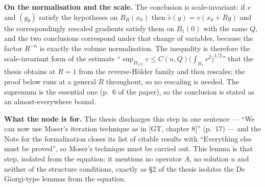 \begin{lemma}
\textbf{On the normalisation and the scale.}  The conclusion is
scale-invariant: if $v$ and $(g_\theta)$ satisfy the hypotheses on $B_R(x_0)$
then $\tilde v(y)=v(x_0+Ry)$ and the correspondingly rescaled gradients satisfy
them on $B_1(0)$ with the same $Q$, and the two conclusions correspond under
that change of variables, because the factor $R^{-n}$ is exactly the volume
normalisation.  The inequality is therefore the scale-invariant form of the
estimate ``$\sup_{B_{1/2}}v\le C(n,Q)\bigl(\int_{B_1}v^2\bigr)^{1/2}$'' that the
thesis obtains at $R=1$ from the reverse-H\"older family and then rescales; the
proof below runs at a general $R$ throughout, so no rescaling is needed.  The
supremum is the essential one (p.~6 of the paper), so the conclusion is stated
as an almost-everywhere bound.

\textbf{What the node is for.}  The thesis discharges this step in one sentence
--- ``We can now use Moser's iteration technique as in [GT, chapter 8]'' (p.~17)
--- and the Note for the formalization closes its list of citable results with
``Everything else must be proved'', so Moser's technique must be carried out.
This lemma is that step, isolated from the equation: it mentions no operator $A$,
no solution $u$ and neither of the structure conditions, exactly as \S2 of the
thesis isolates the De Giorgi-type lemmas from the equation.
\end{lemma}
